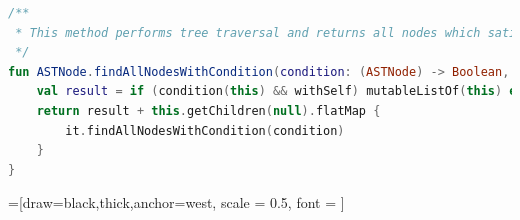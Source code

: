 \begin{enumerate}
\begin{lstlisting}[caption={Method for AST traversal}, label={lst:example1}, language=Kotlin]      
/**
 * This method performs tree traversal and returns all nodes which satisfy the condition
 */
fun ASTNode.findAllNodesWithCondition(condition: (ASTNode) -> Boolean, withSelf: Boolean = true): List<ASTNode> {
    val result = if (condition(this) && withSelf) mutableListOf(this) else mutableListOf()
    return result + this.getChildren(null).flatMap {
        it.findAllNodesWithCondition(condition)
    }
}
\end{lstlisting}

=[draw=black,thick,anchor=west, scale = 0.5, font = \large]
\end{enumerate}